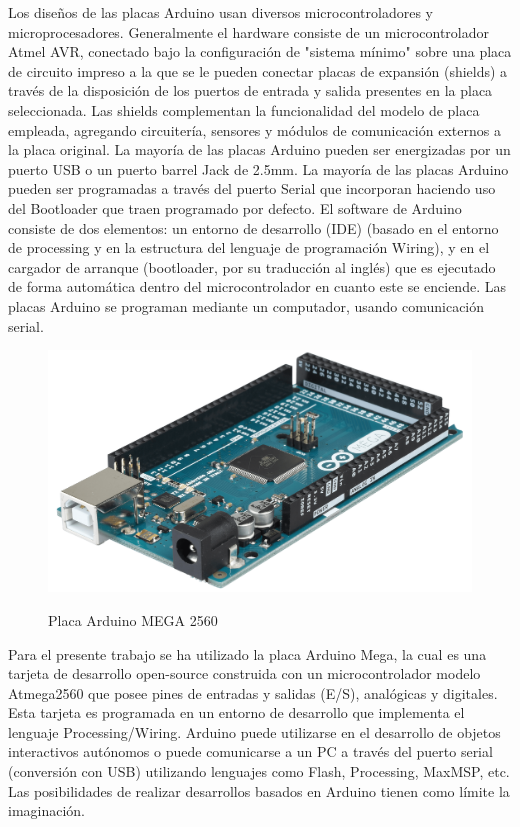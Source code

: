 Los diseños de las placas Arduino usan diversos microcontroladores y microprocesadores. Generalmente el hardware consiste de un microcontrolador Atmel AVR, conectado bajo la 
configuración de "sistema mínimo" sobre una placa de circuito impreso a la que se le pueden conectar placas de expansión (shields) a través de la disposición de los puertos de 
entrada y salida presentes en la placa seleccionada. Las shields complementan la funcionalidad del modelo de placa empleada, agregando circuitería, sensores y módulos de 
comunicación externos a la placa original. La mayoría de las placas Arduino pueden ser energizadas por un puerto USB o un puerto barrel Jack de 2.5mm. La mayoría de las placas 
Arduino pueden ser programadas a través del puerto Serial que incorporan haciendo uso del Bootloader que traen programado por defecto. El software de Arduino consiste de dos 
elementos: un entorno de desarrollo (IDE) (basado en el entorno de processing y en la estructura del lenguaje de programación Wiring), y en el cargador de arranque (bootloader,
por su traducción al inglés) que es ejecutado de forma automática dentro del microcontrolador en cuanto este se enciende. Las placas Arduino se programan mediante un computador, 
usando comunicación serial.\\


\begin{figure}[H]
  \begin{center}
    \includegraphics[scale=0.07]{imagenes/arduino_mega.png}\\
    \caption{Placa Arduino MEGA 2560}
  \end{center}
\end{figure}


Para el presente trabajo se ha utilizado la placa Arduino Mega, la cual es una tarjeta de desarrollo open-source construida con un microcontrolador modelo Atmega2560 que posee 
pines de entradas y salidas (E/S), analógicas y digitales. Esta tarjeta es programada en un entorno de desarrollo que implementa el lenguaje Processing/Wiring. Arduino puede
utilizarse en el desarrollo de objetos interactivos autónomos o puede comunicarse a un PC a través del puerto serial (conversión con USB) utilizando lenguajes como Flash,
Processing, MaxMSP, etc. Las posibilidades de realizar desarrollos basados en Arduino tienen como límite la imaginación.\\

